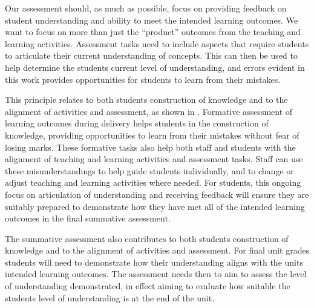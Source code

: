Our assessment should, as much as possible, focus on providing feedback on student understanding and ability to meet the intended learning outcomes. We want to focus on more than just the ``product'' outcomes from the teaching and learning activities. Assessment tasks need to include aspects that require students to articulate their current understanding of concepts. This can then be used to help determine the students current level of understanding, and errors evident in this work provides opportunities for students to learn from their mistakes. 



This principle relates to both students construction of knowledge and to the alignment of activities and assessment, as shown in . Formative assessment of learning outcomes during delivery helps students in the construction of knowledge, providing opportunities to learn from their mistakes without fear of losing marks. These formative tasks also help both staff and students with the alignment of teaching and learning activities and assessment tasks. Staff can use these misunderstandings to help guide students individually, and to change or adjust teaching and learning activities where needed. For students, this ongoing focus on articulation of understanding and receiving feedback will ensure they are suitably prepared to demonstrate how they have met all of the intended learning outcomes in the final summative assessment.

The summative assessment also contributes to both students construction of knowledge and to the alignment of activities and assessment. For final unit grades students will need to demonstrate how their understanding aligns with the units intended learning outcomes. The assessment needs then to aim to assess the level of understanding demonstrated, in effect aiming to evaluate how suitable the students level of understanding is at the end of the unit.


